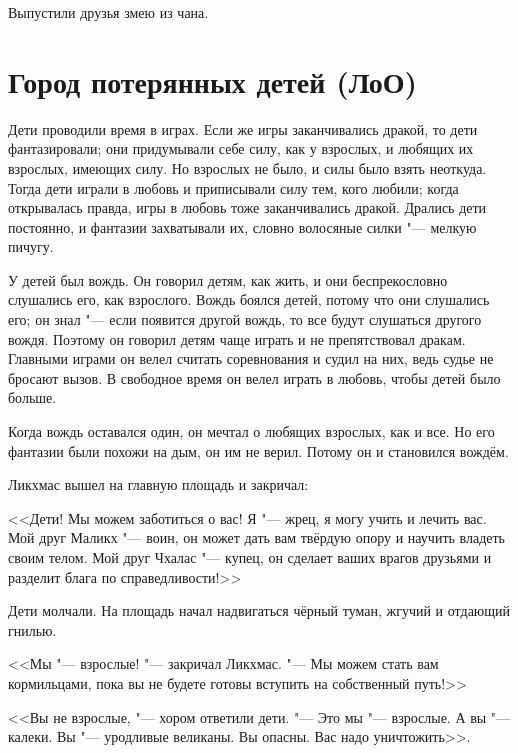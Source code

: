 Выпустили друзья змею из чана.

\section{Город потерянных детей (ЛоО)}

Дети проводили время в играх.
Если же игры заканчивались дракой, то дети фантазировали;
они придумывали себе силу, как у взрослых, и любящих их взрослых, имеющих силу.
Но взрослых не было, и силы было взять неоткуда.
Тогда дети играли в любовь и приписывали силу тем, кого любили;
когда открывалась правда, игры в любовь тоже заканчивались дракой.
Дрались дети постоянно, и фантазии захватывали их, словно волосяные силки "--- мелкую пичугу\footnotemark.

У детей был вождь.
Он говорил детям, как жить, и они беспрекословно слушались его, как взрослого.
Вождь боялся детей, потому что они слушались его;
он знал "--- если появится другой вождь, то все будут слушаться другого вождя.
Поэтому он говорил детям чаще играть и не препятствовал дракам.
Главными играми он велел считать соревнования и судил на них, ведь судье не бросают вызов.
В свободное время он велел играть в любовь, чтобы детей было больше.

Когда вождь оставался один, он мечтал о любящих взрослых, как и все.
Но его фантазии были похожи на дым, он им не верил.
Потому он и становился вождём.

\spacing

Ликхмас вышел на главную площадь и закричал:

<<Дети!
Мы можем заботиться о вас!
Я "--- жрец, я могу учить и лечить вас.
Мой друг Маликх "--- воин, он может дать вам твёрдую опору и научить владеть своим телом.
Мой друг Чхалас "--- купец, он сделает ваших врагов друзьями и разделит блага по справедливости!>>

Дети молчали.
На площадь начал надвигаться чёрный туман, жгучий и отдающий гнилью.

<<Мы "--- взрослые! "--- закричал Ликхмас.
"--- Мы можем стать вам кормильцами, пока вы не будете готовы вступить на собственный путь!>>

<<Вы не взрослые, "--- хором ответили дети.
"--- Это мы "--- взрослые.
А вы "--- калеки.
Вы "--- уродливые великаны.
Вы опасны.
Вас надо уничтожить>>.

